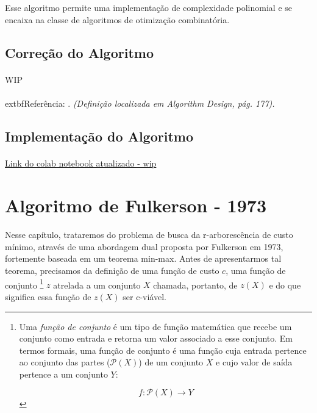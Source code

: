 \documentclass[12pt,a4paper]{article}
\begin{document}
Esse algoritmo permite uma implementação de complexidade polinomial e se encaixa na classe de algoritmos de otimização combinatória.

\subsection{Correção do Algoritmo}
\paragraph{}

WIP

\paragraph{}
	extbf{Referência}: \cite{kleinberg2006}.  
\textit{(Definição localizada em Algorithm Design, pág. 177).}

\subsection{Implementação do Algoritmo}
\paragraph{}

\href{https://colab.research.google.com/drive/1w-lHR_IW0lGOpN7pGPqmFYSP_SvKeJ53?usp=sharing}{Link do colab notebook atualizado - wip}

\section{Algoritmo de Fulkerson - 1973}

\paragraph{}
Nesse capítulo, trataremos do problema de busca da r-arborescência de custo mínimo, através de uma abordagem dual proposta por Fulkerson em 1973, fortemente baseada em um teorema min-max. Antes de apresentarmos tal teorema, precisamos da definição de uma função de custo \( c \), uma função de conjunto \footnote{Uma \textit{função de conjunto} é um tipo de função matemática que recebe um conjunto como entrada e retorna um valor associado a esse conjunto. Em termos formais, uma função de conjunto é uma função cuja entrada pertence ao conjunto das partes (\(\mathcal{P}(X)\)) de um conjunto \(X\) e cujo valor de saída pertence a um conjunto \(Y\):

\[
f: \mathcal{P}(X) \to Y
\]
} \(z \) atrelada a um conjunto \( X\) chamada, portanto, de \(z(X)\) e do que significa essa função de \(z(X)\) ser c-viável.
\end{document}
